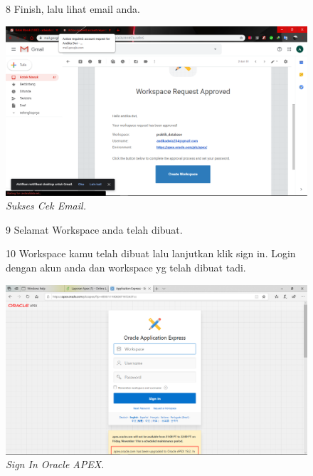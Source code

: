 \begin{enumerate}
\begin{figure}
\item[8] Finish, lalu lihat email anda.

    \begin{center}
\includegraphics[scale=0.2]{figures/006.png}
    \caption{\textit{Sukses Cek Email.}}
        \end{center}
\label{gambar}
\end{figure}

\begin{figure}
\item[9] Selamat Workspace anda telah dibuat.


\label{gambar}
\end{figure}

\begin{figure}
\item[10] Workspace kamu telah dibuat lalu lanjutkan klik sign in. Login dengan akun anda dan workspace yg telah dibuat tadi.

    \begin{center}
\includegraphics[scale=0.2]{figures/000.png}
    \caption{\textit{Sign In Oracle APEX.}}
        \end{center}
\label{gambar}
\end{figure}


\end{enumerate}
